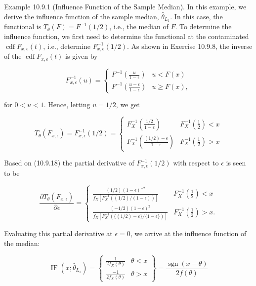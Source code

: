Example 10.9.1 (Influence Function of the Sample Median). In this example, we derive the influence function of the sample median, $\widehat{\theta}_{L_{1}}$. In this case, the functional is $T_{\theta}(F)=F^{-1}(1 / 2)$, i.e., the median of $F$. To determine the influence function, we first need to determine the functional at the contaminated $\operatorname{cdf} F_{x, \epsilon}(t)$, i.e., determine $F_{x, \epsilon}^{-1}(1 / 2)$. As shown in Exercise 10.9.8, the inverse of the $\operatorname{cdf} F_{x, \epsilon}(t)$ is given by

\[
F_{x, \epsilon}^{-1}(u)= \begin{cases}F^{-1}\left(\frac{u}{1-\epsilon}\right) & u<F(x)  \tag{10.9.17}\\ F^{-1}\left(\frac{u-\epsilon}{1-\epsilon}\right) & u \geq F(x),\end{cases}
\]

for $0<u<1$. Hence, letting $u=1 / 2$, we get

\[
T_{\theta}\left(F_{x, \epsilon}\right)=F_{x, \epsilon}^{-1}(1 / 2)= \begin{cases}F_{X}^{-1}\left(\frac{1 / 2}{1-\epsilon}\right) & F_{X}^{-1}\left(\frac{1}{2}\right)<x  \tag{10.9.18}\\ F_{X}^{-1}\left(\frac{(1 / 2)-\epsilon}{1-\epsilon}\right) & F_{X}^{-1}\left(\frac{1}{2}\right)>x\end{cases}
\]

Based on (10.9.18) the partial derivative of $F_{x, \epsilon}^{-1}(1 / 2)$ with respect to $\epsilon$ is seen to be

\[
\frac{\partial T_{\theta}\left(F_{x, \epsilon}\right)}{\partial \epsilon}= \begin{cases}\frac{(1 / 2)(1-\epsilon)^{-2}}{f_{X}\left[F_{X}^{-1}((1 / 2) /(1-\epsilon))\right]} & F_{X}^{-1}\left(\frac{1}{2}\right)<x  \tag{10.9.19}\\ \frac{(-1 / 2)(1-\epsilon)^{2}}{f_{X}\left[F_{X}^{-1}(\{(1 / 2)-\epsilon\} /\{1-\epsilon\})\right]} & F_{X}^{-1}\left(\frac{1}{2}\right)>x .\end{cases}
\]

Evaluating this partial derivative at $\epsilon=0$, we arrive at the influence function of the median:

\[
\operatorname{IF}\left(x ; \hat{\theta}_{L_{1}}\right)=\left\{\begin{array}{cc}
\frac{1}{2 f_{X}(\theta)} & \theta<x  \tag{10.9.20}\\
\frac{-1}{2 f_{X}(\theta)} & \theta>x
\end{array}\right\}=\frac{\operatorname{sgn}(x-\theta)}{2 f(\theta)}
\]

